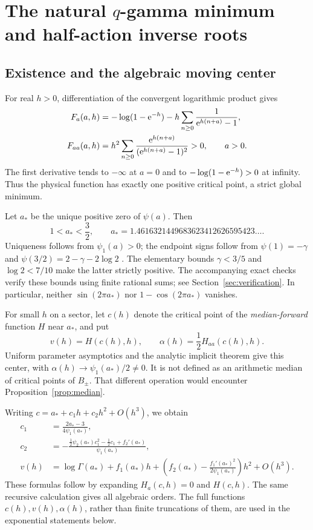 \documentclass[11pt,a4paper]{article}
\numberwithin{equation}{section}
\theoremstyle{definition}
\theoremstyle{remark}\newtheorem{remark}[theorem]{Remark}
\begin{document}
\section{The natural \texorpdfstring{$q$}{q}-gamma minimum and half-action inverse roots}
\label{sec:natural-fold}

\subsection{Existence and the algebraic moving center}
For real $h>0$, differentiation of the convergent logarithmic product
gives
\begin{align}
 F_a(a,h)&=-\log(1-\mathrm e^{-h})
          -h\sum_{n\ge0}\frac1{\mathrm e^{h(n+a)}-1},\label{eq:Fprime}\\
 F_{aa}(a,h)&=h^2\sum_{n\ge0}
   \frac{\mathrm e^{h(n+a)}}{(\mathrm e^{h(n+a)}-1)^2}>0,\qquad a>0.
                         \label{eq:Fsecond}
\end{align}
The first derivative tends to $-\infty$ at $a=0$ and to
$-\log(1-\mathrm e^{-h})>0$ at infinity. Thus the physical function has
exactly one positive critical point, a strict global minimum.

Let $a_*$ be the unique positive zero of $\psi(a)$. Then
\begin{equation}\label{eq:astar}
 1<a_*<\frac32,\qquad
 a_*=1.4616321449683623412626595423\ldots.
\end{equation}
Uniqueness follows from $\psi_1(a)>0$; the endpoint signs follow from
$\psi(1)=-\gamma$ and $\psi(3/2)=2-\gamma-2\log2$ \cite{dlmfgamma}.
The elementary bounds $\gamma<3/5$ and $\log2<7/10$ make the latter
strictly positive. The accompanying exact checks verify these bounds
using finite rational sums; see Section~\ref{sec:verification}.
In particular, neither $\sin(2\pi a_*)$ nor $1-\cos(2\pi a_*)$ vanishes.

For small $h$ on a sector, let $c(h)$ denote the critical point of the
\emph{median-forward} function $H$ near $a_*$, and put
\begin{equation}\label{eq:median-center}
 v(h)=H(c(h),h),\qquad \alpha(h)=\frac12 H_{aa}(c(h),h).
\end{equation}
Uniform parameter asymptotics and the analytic implicit theorem give
this center, with $\alpha(h)\to\psi_1(a_*)/2\ne0$.
It is not defined as an arithmetic median of critical points of $B_\pm$.
That different operation would encounter Proposition~\ref{prop:median}.

Writing $c=a_*+c_1h+c_2h^2+O(h^3)$, we obtain
\begin{align}
 c_1&=\frac{2a_*-3}{4\psi_1(a_*)},\label{eq:c1}\\
 c_2&=-\frac{\tfrac12\psi_2(a_*)c_1^2-\tfrac12c_1+f_2'(a_*)}
                 {\psi_1(a_*)},\label{eq:c2}\\
 v(h)&=\log\Gamma(a_*)+f_1(a_*)h
    +\left(f_2(a_*)-\frac{f_1'(a_*)^2}{2\psi_1(a_*)}\right)h^2
       +O(h^3).\label{eq:vexp}
\end{align}
These formulas follow by expanding $H_a(c,h)=0$ and $H(c,h)$.
The same recursive calculation gives all algebraic orders. The full
functions $c(h),v(h),\alpha(h)$, rather than finite truncations of them,
are used in the exponential statements below.
\end{document}
